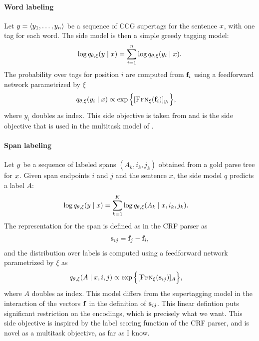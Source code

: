 \paragraph{Word labeling}
Let $y = \langle y_1, \dots, y_n \rangle$ be a sequence of CCG supertags for the sentence $x$, with one tag for each word. The side model is then a simple greedy tagging model:
\begin{align*}
  \log q_{\theta, \xi}(y \mid x)
    &= \sum_{i=1}^n \log q_{\theta, \xi}( y_i \mid x).  \\
\end{align*}
The probability over tags for position $i$ are computed from $\mathbf{f}_i$ using a feedforward network parametrized by $\xi$
\begin{align*}
  q_{\theta, \xi}( y_i \mid x) &\propto \exp \Big \{ [ \textsc{Ffn}_{\xi}( \mathbf{f}_{i} ) ]_{y_i} \Big\},
\end{align*}
where $y_i$ doubles as index. This side objective is taken from \citet{enguehard2017multitask} and is the side objective that is used in the multitask model of \citet{linzen2018targeted}.

\paragraph{Span labeling}
Let $y$ be a sequence of labeled spans $(A_k, i_k, j_k)$ obtained from a gold parse tree for $x$. Given span endpoints $i$ and $j$ and the sentence $x$, the side model $q$ predicts a label $A$:
\begin{align*}
  \log q_{\theta, \xi}(y \mid x)
    &= \sum_{k=1}^K \log q_{\theta, \xi}( A_k \mid x, i_k, j_k).
\end{align*}
The representation for the span is defined as in the CRF parser as
\begin{align*}
  \mathbf{s}_{ij} = \mathbf{f}_j - \mathbf{f}_i,
\end{align*}
and the distribution over labels is computed using a feedforward network parametrized by $\xi$ as
\begin{align*}
  q_{\theta, \xi}( A \mid x, i, j) &\propto \exp \Big \{ [ \textsc{Ffn}_{\xi}( \mathbf{s}_{ij} ) ]_{A} \Big\},
\end{align*}
where $A$ doubles as index. This model differs from the supertagging model in the interaction of the vectors $\mathbf{f}$ in the definition of $\mathbf{s}_{ij}$. This linear defintion puts significant restriction on the encodings, which is precisely what we want. This side objective is inspired by the label scoring function of the CRF parser, and is novel as a multitask objective, as far as I know.

